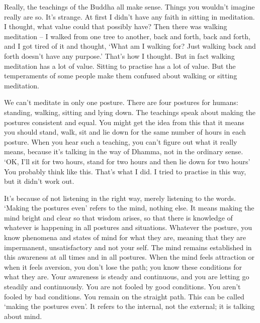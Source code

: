 
Really, the teachings of the Buddha all make sense. Things you wouldn't imagine really are so. It's strange. At first I didn't have any faith in sitting in meditation. I thought, what value could that possibly have? Then there was walking meditation -- I walked from one tree to another, back and forth, back and forth, and I got tired of it and thought, `What am I walking for? Just walking back and forth doesn't have any purpose.' That's how I thought. But in fact walking meditation has a lot of value. Sitting to practise  has a lot of value. But the temperaments of some people make them confused about walking or sitting meditation.

We can't meditate in only one posture. There are four postures for humans: standing, walking, sitting and lying down. The teachings speak about making the postures consistent and equal. You might get the idea from this that it means you should stand, walk, sit and lie down for the same number of hours in each posture. When you hear such a teaching, you can't figure out what it really means, because it's talking in the way of Dhamma, not in the ordinary sense. `OK, I'll sit for two hours, stand for two hours and then lie down for two hours' You probably think like this. That's what I did. I tried to practise in this way, but it didn't work out.

It's because of not listening in the right way, merely listening to the words. `Making the postures even' refers to the mind, nothing else. It means making the mind bright and clear so that wisdom arises, so that there is knowledge of whatever is happening in all postures and situations. Whatever the posture, you know phenomena and states of mind for what they are, meaning that they are impermanent, unsatisfactory and not your self. The mind remains established in this awareness at all times and in all postures. When the mind feels attraction or when it feels aversion, you don't lose the path; you know these conditions for what they are. Your awareness is steady and continuous, and you are letting go steadily and continuously. You are not fooled by good conditions. You aren't fooled by bad conditions. You remain on the straight path. This can be called `making the postures even'. It refers to the internal, not the external; it is talking about mind.

